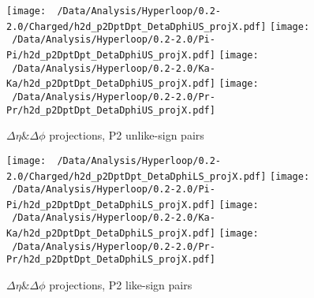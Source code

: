 \documentclass[ALICE,manyauthors]{ALICE_analysis_notes}
\begin{document}
\begin{figure}[H]
	\hfill
	\centering
	\texttt{[image: ~/Data/Analysis/Hyperloop/0.2-2.0/Charged/h2d\_p2DptDpt\_DetaDphiUS\_projX.pdf]}
	\texttt{[image: ~/Data/Analysis/Hyperloop/0.2-2.0/Pi-Pi/h2d\_p2DptDpt\_DetaDphiUS\_projX.pdf]}
	\texttt{[image: ~/Data/Analysis/Hyperloop/0.2-2.0/Ka-Ka/h2d\_p2DptDpt\_DetaDphiUS\_projX.pdf]}
	\texttt{[image: ~/Data/Analysis/Hyperloop/0.2-2.0/Pr-Pr/h2d\_p2DptDpt\_DetaDphiUS\_projX.pdf]}
	\\
	\hfill
	\caption{$\Delta\eta\&\Delta\phi$ projections, P2 unlike-sign pairs}
\end{figure}
\begin{figure}[H]
	\hfill
	\centering
	\texttt{[image: ~/Data/Analysis/Hyperloop/0.2-2.0/Charged/h2d\_p2DptDpt\_DetaDphiLS\_projX.pdf]}
	\texttt{[image: ~/Data/Analysis/Hyperloop/0.2-2.0/Pi-Pi/h2d\_p2DptDpt\_DetaDphiLS\_projX.pdf]}
	\texttt{[image: ~/Data/Analysis/Hyperloop/0.2-2.0/Ka-Ka/h2d\_p2DptDpt\_DetaDphiLS\_projX.pdf]}
	\texttt{[image: ~/Data/Analysis/Hyperloop/0.2-2.0/Pr-Pr/h2d\_p2DptDpt\_DetaDphiLS\_projX.pdf]}
	\\
	\hfill
	\caption{$\Delta\eta\&\Delta\phi$ projections, P2 like-sign pairs}
\end{figure}
\end{document}
